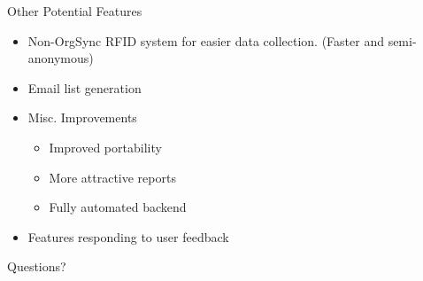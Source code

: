 \documentclass{beamer}
\begin{document}
\begin{frame}{Other Potential Features}
    \begin{itemize}
        \item Non-OrgSync RFID system for easier data collection. (Faster and semi-anonymous)
        \item Email list generation
        \item Misc. Improvements
            \begin{itemize}
                \item Improved portability
                \item More attractive reports
                \item Fully automated backend
            \end{itemize}
        \item Features responding to user feedback 
    \end{itemize}
\end{frame}

\begin{frame}[standout]
    Questions?
\end{frame}
\end{document}
